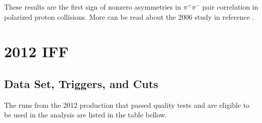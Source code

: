 \documentclass[abstract = on,listof=totoc, bibliography=totoc]{scrreprt}
\newcommand{\pip}{\pi^+}
\newcommand{\pim}{\pi^-}
\newcommand{\pair}{$\pip\pim$ }
\begin{document}
These results are the first sign of nonzero asymmetries in \pair pair correlation in polarized proton collisions. More can be read about the 2006 study in reference \cite{2006Paper}.

\chapter{2012 IFF}

\section{Data Set, Triggers, and Cuts}

The runs from the 2012 production that passed quality tests and are eligible to be used in the analysis are listed in the table bellow.
\end{document}
